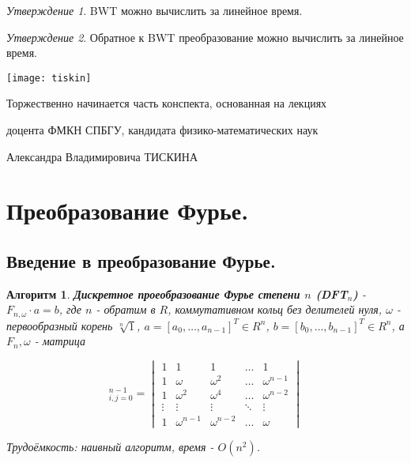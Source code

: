 \documentclass[a4paper]{article}
\theoremstyle{indented}
\newtheorem{alg}{Алгоритм}
\theoremstyle{definition}
\theoremstyle{remark}
\newtheorem{stat}{Утверждение}
\begin{document}
\begin{stat}
    BWT можно вычислить за линейное время.
\end{stat}

\begin{stat}
    Обратное к BWT преобразование можно вычислить за линейное время.
\end{stat}

\newpage

\begin{center}
\texttt{[image: tiskin]}

Торжественно начинается часть конспекта, основанная на лекциях \ 

доцента ФМКН СПБГУ, кандидата физико-математических наук \ 

Александра Владимировича ТИСКИНА 
\end{center}

\section{Преобразование Фурье.}

\subsection{Введение в преобразование Фурье.}

\begin{alg}
    \textbf{Дискретное проеобразование Фурье степени $n$ (DFT$_n$)} - $F_{n, \omega}\cdot a = b$, где $n$ - обратим в $R$, коммутативном кольц без делителей нуля, $\omega$ - первообразный корень $\sqrt[n]{1}$, $a=[a_0, \ldots, a_{n-1}]^T\in R^n$, $b=[b_0, \ldots, b_{n-1}]^T\in R^n$, а $F_n, \omega$ - матрица
    
    \begin{equation*}
        [\omega^{ij}]_{i, j=0}^{n-1}=
        \begin{vmatrix}
            1 & 1 & 1 & \dots & 1 \\
            1 & \omega & \omega^2 & \dots & \omega^{n-1} \\
            1 & \omega^2 & \omega^4 & \dots & \omega^{n-2} \\
            \vdots & \vdots & \vdots & \ddots & \vdots \\
            1 & \omega^{n-1} & \omega^{n-2} & \dots & \omega 
        \end{vmatrix}
    \end{equation*}

    Трудоёмкость: наивный алгоритм, время - $O(n^2)$. 
\end{alg} \
\end{document}
